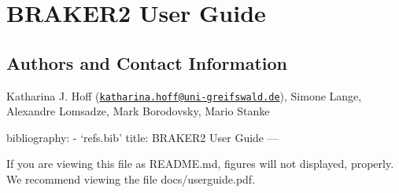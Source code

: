 \documentclass[]{article}
\date{}
\begin{document}
\section{BRAKER2 User Guide}\label{braker2-user-guide}

\subsection{Authors and Contact
Information}\label{authors-and-contact-information}

Katharina J. Hoff
(\href{mailto:katharina.hoff@uni-greifswald.de}{\nolinkurl{katharina.hoff@uni-greifswald.de}}),
Simone Lange, Alexandre Lomsadze, Mark Borodovsky, Mario Stanke

bibliography: - `refs.bib' title: BRAKER2 User Guide ---

If you are viewing this file as README.md, figures will not displayed, properly. We recommend viewing the file docs/userguide.pdf.
\end{document}
